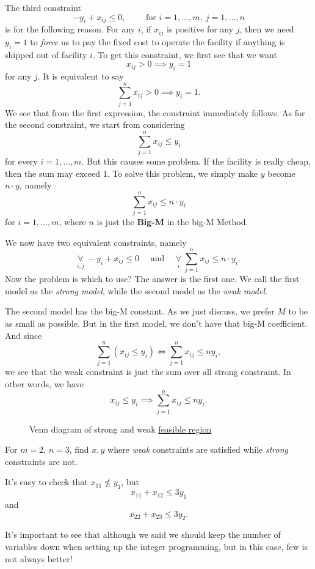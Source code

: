 \begin{note}
	The third constraint
	\[
		-y_{i} + x_{ij}\leq 0,\qquad \text{ for }i = 1, \ldots , m,\ j = 1, \ldots , n
	\]
	is for the following reason. For any \(i\), if \(x_{ij}\) is positive for any \(j\), then we need \(y_{i} = 1\) to \emph{force} us to pay the fixed cost
	to operate the facility if anything is shipped out of facility \(i\). To get this constraint, we first see that we want
	\[
		x_{ij}>0 \implies y_{i} = 1
	\]
	for any \(j\). It is equivalent to say
	\[
		\sum\limits_{j=1}^{n} x_{ij}>0 \implies y_{i} = 1.
	\]
	We see that from the first expression, the constraint immediately follows. As for the second constraint, we start from considering
	\[
		\sum\limits_{j=1}^{n} x_{ij}\leq y_{i}
	\]
	for every \(i = 1, \ldots , m\). But this causes some problem. If the facility is really cheap, then the sum may exceed \(1\).
	To solve this problem, we simply make \(y\) become \(n\cdot y\), namely
	\[
		\sum\limits_{j=1}^{n} x_{ij}\leq n\cdot y_{i}
	\]
	for \(i = 1, \ldots, m\), where \(n\) is just the \textbf{Big-M} in the big-M Method.
\end{note}

We now have two equivalent constraints, namely
\[
	\underset{i, j}{\forall }\ -y_{i} + x_{ij}\leq 0\quad  \text{ and }\quad \underset{i}{\forall }\ \sum\limits_{j=1}^{n} x_{ij}\leq n\cdot y_{i}.
\]
Now the problem is which to use? The answer is the first one. We call the first model as the \emph{strong model}, while the second model as
the \emph{weak model}.

\begin{intuition}
	The second model has the big-M constant. As we just discuss, we prefer \(M\) to be as small as possible. But in the first model, we don't have that
	big-M coefficient. And since
	\[
		\sum\limits_{j=1}^{n} \left(x_{ij}\leq y_i\right) \iff \sum\limits_{j=1}^{n} x_{ij}\leq n y_{i},
	\]
	we see that the weak constraint is just the sum over all strong constraint. In other words, we have
	\[
		x_{ij}\leq y_i \implies \sum\limits_{j=1}^{n} x_{ij}\leq n y_{i}.
	\]
	\begin{figure}[H]
		\centering
		\caption{Venn diagram of strong and weak \hyperref[def:feasible-region]{feasible region}}
		\label{fig:strong-weak-constraint}
	\end{figure}

	\begin{eg}
		For \(m = 2\), \(n = 3\), find \(x, y\) where \emph{weak} constraints are satisfied while \emph{strong} constraints are not.
		\begin{center}
		\end{center}
		It's easy to check that \(x_{11}\nleq y_1\), but
		\[
			x_{11}+x_{12} \leq 3y_1
		\]
		and
		\[
			x_{22}+x_{23}\leq 3y_2.
		\]
	\end{eg}
\end{intuition}
\begin{remark}
	It's important to see that although we said we should keep the number of variables down when setting up the integer programming, but in this case,
	few is not always better!
\end{remark}

